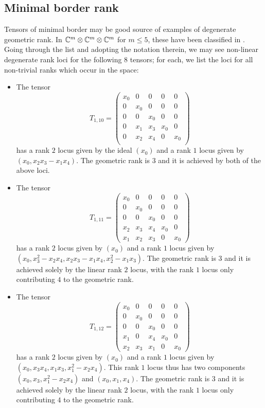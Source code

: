 \documentclass[a4paper,10pt]{article}
\def\mtrx#1{\begin{pmatrix}#1\end{pmatrix}}
\theoremstyle{definition}
\theoremstyle{remark}
\begin{document}
\subsection{Minimal border rank}

Tensors of minimal border may be good source of examples of degenerate geometric rank. In $\ce^m\otimes\ce^m\otimes\ce^m$ for $m\leq 5$, these have been classified in \cite[Section 4]{jagiella-jelisiejew}. Going through the list and adopting the notation therein, we may see non-linear degenerate rank loci for the following $8$ tensors; for each, we list the loci for all non-trivial ranks which occur in the space:
\begin{itemize}
    \item The tensor
    \[
        T_{1,10} = \mtrx{
            x_0 & 0 & 0 & 0 & 0 \\
            0 & x_0 & 0 & 0 & 0 \\
            0 & 0 & x_0 & 0 & 0 \\
            0 & x_1 & x_3 & x_0 & 0 \\
            0 & x_2 & x_4 & 0 & x_0 \\
        }
    \]
    has a rank $2$ locus given by the ideal $(x_0)$ and a rank $1$ locus given by $(x_0, x_2x_3-x_1x_4)$. The geometric rank is $3$ and it is achieved by both of the above loci.

    \item The tensor
    \[
        T_{1,11} = \mtrx{
            x_0 & 0 & 0 & 0 & 0 \\
            0 & x_0 & 0 & 0 & 0 \\
            0 & 0 & x_0 & 0 & 0 \\
            x_2 & x_3 & x_4 & x_0 & 0 \\
            x_1 & x_2 & x_3 & 0 & x_0
        }
    \]
    has a rank $2$ locus given by $(x_0)$ and a rank $1$ locus given by $(x_0, x_3^2-x_2x_4, x_2x_3-x_1x_4, x_2^2-x_1x_3)$. The geometric rank is $3$ and it is achieved solely by the linear rank $2$ locus, with the rank $1$ locus only contributing $4$ to the geometric rank.

    \item The tensor
    \[
        T_{1,12} = \mtrx{
            x_0 & 0 & 0 & 0 & 0 \\
            0 & x_0 & 0 & 0 & 0 \\
            0 & 0 & x_0 & 0 & 0 \\
            x_1 & 0 & x_4 & x_0 & 0 \\
            x_2 & x_3 & x_1 & 0 & x_0
        }
    \]
    has a rank $2$ locus given by $(x_0)$ and a rank $1$ locus given by $(x_0, x_3x_4, x_1x_3, x_1^2-x_2x_4)$. This rank $1$ locus thus has two components $(x_0,x_3, x_1^2-x_2x_4)$ and $(x_0, x_1,x_4)$. The geometric rank is $3$ and it is achieved solely by the linear rank $2$ locus, with the rank $1$ locus only contributing $4$ to the geometric rank.


\end{itemize}
\end{document}
